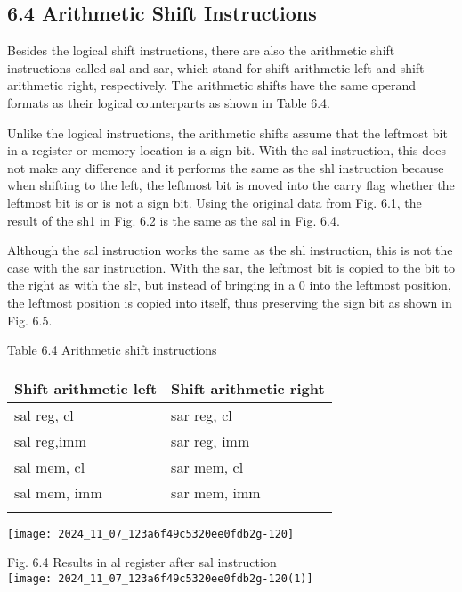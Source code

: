 \documentclass[10pt]{article}
\begin{document}
\subsection*{6.4 Arithmetic Shift Instructions}
Besides the logical shift instructions, there are also the arithmetic shift instructions called sal and sar, which stand for shift arithmetic left and shift arithmetic right, respectively. The arithmetic shifts have the same operand formats as their logical counterparts as shown in Table 6.4.

Unlike the logical instructions, the arithmetic shifts assume that the leftmost bit in a register or memory location is a sign bit. With the sal instruction, this does not make any difference and it performs the same as the shl instruction because when shifting to the left, the leftmost bit is moved into the carry flag whether the leftmost bit is or is not a sign bit. Using the original data from Fig. 6.1, the result of the sh1 in Fig. 6.2 is the same as the sal in Fig. 6.4.

Although the sal instruction works the same as the shl instruction, this is not the case with the sar instruction. With the sar, the leftmost bit is copied to the bit to the right as with the slr, but instead of bringing in a 0 into the leftmost position, the leftmost position is copied into itself, thus preserving the sign bit as shown in Fig. 6.5.

Table 6.4 Arithmetic shift instructions

\begin{center}
\begin{tabular}{|ll|}
\hline
Shift arithmetic left & Shift arithmetic right \\
\hline
sal reg, cl & sar reg, cl \\
sal reg,imm & sar reg, imm \\
sal mem, cl & sar mem, cl \\
sal mem, imm & sar mem, imm \\
 &  \\
\hline
\end{tabular}
\end{center}

\begin{center}
\texttt{[image: 2024\_11\_07\_123a6f49c5320ee0fdb2g-120]}
\end{center}

Fig. 6.4 Results in al register after sal instruction\\
\texttt{[image: 2024\_11\_07\_123a6f49c5320ee0fdb2g-120(1)]}
\end{document}
